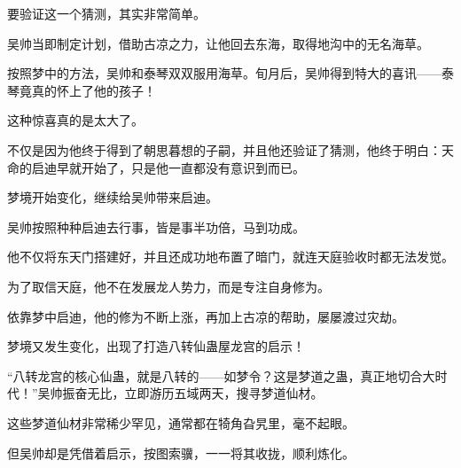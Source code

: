 \begin{this_body}
要验证这一个猜测，其实非常简单。

吴帅当即制定计划，借助古凉之力，让他回去东海，取得地沟中的无名海草。

按照梦中的方法，吴帅和泰琴双双服用海草。旬月后，吴帅得到特大的喜讯——泰琴竟真的怀上了他的孩子！

这种惊喜真的是太大了。

不仅是因为他终于得到了朝思暮想的子嗣，并且他还验证了猜测，他终于明白：天命的启迪早就开始了，只是他一直都没有意识到而已。

梦境开始变化，继续给吴帅带来启迪。

吴帅按照种种启迪去行事，皆是事半功倍，马到功成。

他不仅将东天门搭建好，并且还成功地布置了暗门，就连天庭验收时都无法发觉。

为了取信天庭，他不在发展龙人势力，而是专注自身修为。

依靠梦中启迪，他的修为不断上涨，再加上古凉的帮助，屡屡渡过灾劫。

梦境又发生变化，出现了打造八转仙蛊屋龙宫的启示！

“八转龙宫的核心仙蛊，就是八转的——如梦令？这是梦道之蛊，真正地切合大时代！”吴帅振奋无比，立即游历五域两天，搜寻梦道仙材。

这些梦道仙材非常稀少罕见，通常都在犄角旮旯里，毫不起眼。

但吴帅却是凭借着启示，按图索骥，一一将其收拢，顺利炼化。

\end{this_body}

